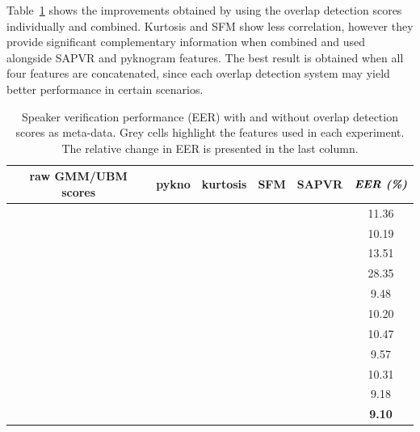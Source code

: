Table~\ref{tab:ch3_sid_stack_results} shows the improvements obtained by using the overlap detection scores individually and combined. 
Kurtosis and SFM show less correlation, however they provide significant complementary information when combined and used alongside SAPVR and pyknogram features. 
The best result is obtained when all four features are concatenated, since each overlap detection system may yield better performance in certain scenarios.  


\begin{table}[t]
	\centering
	\caption{ Speaker verification performance (EER) with and without overlap detection scores as meta-data. Grey cells highlight the features used in each experiment. The relative change in EER is presented in the last column.}
	\begin{tabular}{|c|c|c|c|c|c|}
		\hline
		raw GMM/UBM scores & pykno & kurtosis & SFM & SAPVR & $\textit{\textbf{EER (\%)}}$ \\ \hline
		\cellcolor[HTML]{C0C0C0}{\color[HTML]{343434} } \checkmark &  &  &  &  & 11.36\\ \hline \hline
		\cellcolor[HTML]{C0C0C0} \checkmark & \cellcolor[HTML]{C0C0C0} \checkmark &  &  &  & 10.19 \\ \hline
		\cellcolor[HTML]{C0C0C0} \checkmark &  & \cellcolor[HTML]{C0C0C0} \checkmark &  &  & 13.51 \\ \hline
		\cellcolor[HTML]{C0C0C0}{\color[HTML]{343434} } \checkmark &  &  & \cellcolor[HTML]{C0C0C0}{\color[HTML]{343434} } \checkmark &  & 28.35 \\ \hline
		\cellcolor[HTML]{C0C0C0} \checkmark &  &  &  & \cellcolor[HTML]{C0C0C0} \checkmark & 9.48 \\ \hline \hline
		\cellcolor[HTML]{C0C0C0}{\color[HTML]{343434} } \checkmark & \cellcolor[HTML]{C0C0C0} \checkmark & \cellcolor[HTML]{C0C0C0}{\color[HTML]{343434} } \checkmark &  &  & 10.20 \\ \hline
		\cellcolor[HTML]{C0C0C0} \checkmark & \cellcolor[HTML]{C0C0C0} \checkmark &  & \cellcolor[HTML]{C0C0C0} \checkmark &  & 10.47 \\ \hline
		\cellcolor[HTML]{C0C0C0} \checkmark & \cellcolor[HTML]{C0C0C0} \checkmark &  &  & \cellcolor[HTML]{C0C0C0} \checkmark & 9.57 \\ \hline \hline
		\cellcolor[HTML]{C0C0C0} \checkmark & \cellcolor[HTML]{C0C0C0} \checkmark & \cellcolor[HTML]{C0C0C0} \checkmark & \cellcolor[HTML]{C0C0C0} \checkmark &  & 10.31 \\ \hline
		\cellcolor[HTML]{C0C0C0} \checkmark & \cellcolor[HTML]{C0C0C0} \checkmark & \cellcolor[HTML]{C0C0C0} \checkmark & \cellcolor[HTML]{FFFFFF} & \cellcolor[HTML]{C0C0C0} \checkmark & 9.18 \\ \hline
		\cellcolor[HTML]{C0C0C0} \checkmark & \cellcolor[HTML]{C0C0C0} \checkmark & \cellcolor[HTML]{C0C0C0} \checkmark & \cellcolor[HTML]{C0C0C0} \checkmark & \cellcolor[HTML]{C0C0C0} \checkmark & {\bf 9.10}\\ \hline
	\end{tabular}
	\label{tab:ch3_sid_stack_results}
	\vspace{-5mm}
\end{table}

